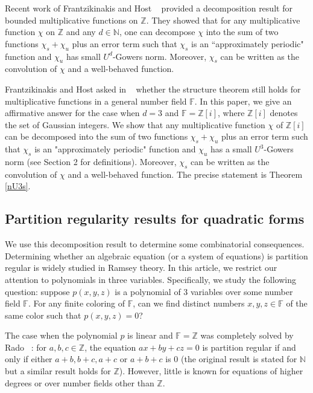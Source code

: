 \documentclass[12pt,amstex]{amsart}
\theoremstyle{definition}
\def \Z {\mathbb{Z}[i]}
\begin{document}
 Recent work of Frantzikinakis and Host ~\cite{FH} provided a decomposition result for
bounded multiplicative functions on $\mathbb{Z}$.
 They showed that for any multiplicative function $\chi$ on $\mathbb{Z}$ and any $d\in\mathbb{N}$, one can decompose $\chi$ into the sum of two functions $\chi_{s}+\chi_{u}$ plus an error term such that $\chi_{s}$ is an ``approximately periodic" function and $\chi_{u}$ has small $U^{d}$-Gowers norm. Moreover, $\chi_{s}$ can be written as the convolution of $\chi$ and a well-behaved function.

 Frantzikinakis and Host asked in ~\cite{FH} whether the structure theorem still holds for multiplicative functions in a general number field $\mathbb{F}$. In this paper, we give an affirmative answer for the case when $d=3$ and $\mathbb{F}=\Z$, where $\Z$ denotes the set of Gaussian integers. We show that any multiplicative function $\chi$ of $\mathbb{Z}[i]$ can be decomposed into the sum of two functions $\chi_{s}+\chi_{u}$ plus an error term such that $\chi_{s}$ is an "approximately periodic" function and $\chi_{u}$ has a small $U^{3}$-Gowers norm (see Section 2 for definitions). Moreover, $\chi_{s}$ can be written as the convolution of $\chi$ and a well-behaved function. The precise statement is Theorem \ref{nU3s}.

\subsection{Partition regularity results for quadratic forms} We use this decomposition result to determine some combinatorial consequences.
Determining whether an algebraic equation (or a system of equations) is partition regular is widely studied in Ramsey theory.
In this article, we restrict our attention to polynomials in three variables. Specifically, we study the following question:
suppose $p(x,y,z)$ is a polynomial of 3 variables over some number field $\mathbb{F}$. For any finite coloring of $\mathbb{F}$, can we find distinct numbers $x,y,z\in\mathbb{F}$ of the same color such that $p(x,y,z)=0$?

The case when the polynomial $p$ is linear and $\mathbb{F}=\mathbb{Z}$  was completely solved by Rado ~\cite{Rado}: for $a,b,c\in\mathbb{Z}$, the equation
$ax+by+cz=0$ is partition regular if and only if either $a+b, b+c, a+c$ or $a+b+c$ is 0 (the original result is stated for $\mathbb{N}$ but a similar result holds for $\mathbb{Z}$).
However, little is known for equations of higher degrees or over number fields other than $\mathbb{Z}$.
\end{document}
